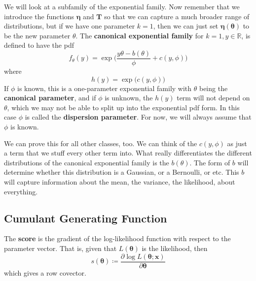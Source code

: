     We will look at a subfamily of the exponential family. Now remember that we introduce the functions $\boldsymbol{\eta}$ and $\mathbf{T}$ so that we can capture a much broader range of distributions, but if we have one parameter $k = 1$, then we can just set $\boldsymbol{\eta}(\boldsymbol{\theta})$ to be the new parameter $\theta$. The \textbf{canonical exponential family} for $k = 1, y \in \mathbb{R}$, is defined to have the pdf 
    \begin{equation}
      f_\theta (y) = \exp \bigg( \frac{y \theta - b(\theta)}{\phi} + c(y, \phi) \bigg)
    \end{equation}
    where 
    \begin{equation}
      h(y) = \exp \big( c(y, \phi)\big)
    \end{equation}
    If $\phi$ is known, this is a one-parameter exponential family with $\theta$ being the \textbf{canonical parameter}, and if $\phi$ is unknown, the $h(y)$ term will not depend on $\theta$, which we may not be able to split up into the exponential pdf form. In this case $\phi$ is called the \textbf{dispersion parameter}. For now, we will always assume that $\phi$ is known. 

    We can prove this for all other classes, too. We can think of the $c(y, \phi)$ as just a term that we stuff every other term into. What really differentiates the different distributions of the canonical exponential family is the $b(\theta)$. The form of $b$ will determine whether this distribution is a Gaussian, or a Bernoulli, or etc. This $b$ will capture information about the mean, the variance, the likelihood, about everything. 

    \subsection{Cumulant Generating Function}

      \begin{definition}[Score]
      The \textbf{score} is the gradient of the log-likelihood function with respect to the parameter vector. That is, given that $L(\boldsymbol{\theta})$ is the likelihood, then 
      \[s(\boldsymbol{\theta}) \coloneqq \frac{\partial \log L(\boldsymbol{\theta}; \mathbf{x})}{\partial \boldsymbol{\theta}}\]
      which gives a row covector. 
      \end{definition}

